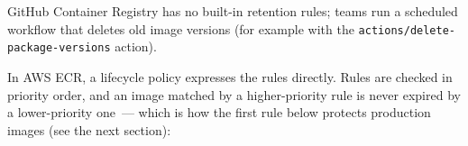 \noindent{}GitHub Container Registry has no built-in retention rules; teams run a scheduled workflow that deletes old image versions (for example with the \texttt{actions/}\allowbreak{}\texttt{delete-}\allowbreak{}\texttt{package-}\allowbreak{}\texttt{versions} action).

In AWS ECR, a lifecycle policy expresses the rules directly. Rules are checked in priority order, and an image matched by a higher-priority rule is never expired by a lower-priority one~--- which is how the first rule below protects production images (see the next section):

\begin{codebox}

\begin{Shaded}
\begin{Highlighting}[]
\FunctionTok{\{}
  \FunctionTok{:} \OtherTok{[}
    \FunctionTok{\{}
      \FunctionTok{:} \FunctionTok{,}
      \FunctionTok{:} \FunctionTok{,}
      \FunctionTok{:} \FunctionTok{\{}
        \FunctionTok{:} \FunctionTok{,}
        \FunctionTok{:} \OtherTok{[}\OtherTok{]}\FunctionTok{,}
        \FunctionTok{:} \FunctionTok{,}
        \FunctionTok{:} 
      \FunctionTok{\},}
      \FunctionTok{:} \FunctionTok{\{}
        \FunctionTok{:} 
      \FunctionTok{\}}
    \FunctionTok{\}}\OtherTok{,}
    \FunctionTok{\{}
      \FunctionTok{:} \FunctionTok{,}
      \FunctionTok{:} \FunctionTok{,}
      \FunctionTok{:} \FunctionTok{\{}
        \FunctionTok{:} \FunctionTok{,}
        \FunctionTok{:} \OtherTok{[}\OtherTok{]}\FunctionTok{,}
        \FunctionTok{:} \FunctionTok{,}
        \FunctionTok{:} 
      \FunctionTok{\},}
      \FunctionTok{:} \FunctionTok{\{}
        \FunctionTok{:} 
      \FunctionTok{\}}
    \FunctionTok{\}}
  \OtherTok{]}
\FunctionTok{\}}
\end{Highlighting}
\end{Shaded}

\end{codebox}

